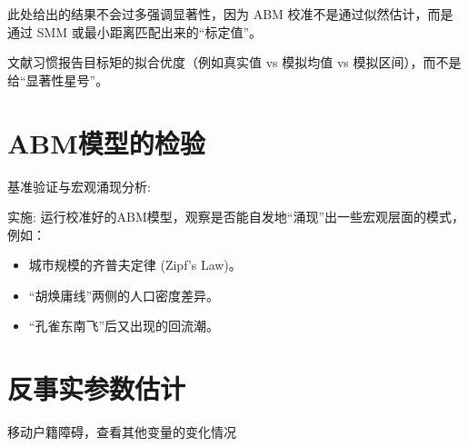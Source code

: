 \documentclass[
  a4paper,
  zihao=-4,
  fontset=mac,
  AutoFakeBold,
  AutoFakeSlant,
  oneside]{ctexbook}
\begin{document}
此处给出的结果不会过多强调显著性，因为 ABM 校准不是通过似然估计，而是通过 SMM 或最小距离匹配出来的“标定值”。

文献习惯报告目标矩的拟合优度（例如真实值 vs 模拟均值 vs 模拟区间），而不是给“显著性星号”。







\section{ABM模型的检验} %
\label{sub:abm模型的检验}


基准验证与宏观涌现分析:

实施: 运行校准好的ABM模型，观察是否能自发地“涌现”出一些宏观层面的模式，例如：
\begin{itemize}
  \item 城市规模的齐普夫定律 (Zipf's Law)。
  \item “胡焕庸线”两侧的人口密度差异。
  \item “孔雀东南飞”后又出现的回流潮。
\end{itemize}










\section{反事实参数估计}


移动户籍障碍，查看其他变量的变化情况
\end{document}
